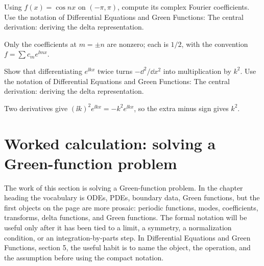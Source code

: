 \begin{exercise}
Using \(f(x)=\cos nx\) on \((-\pi,\pi)\), compute its complex Fourier coefficients.  Use the notation of Differential Equations and Green Functions: The central derivation: deriving the delta representation.
\begin{answer}
Only the coefficients at \(m=\pm n\) are nonzero; each is \(1/2\), with the convention \(f=\sum c_me^{\ii mx}\).
\end{answer}
\end{exercise}

\begin{exercise}
Show that differentiating \(e^{\ii kx}\) twice turns \(-\dd^2/\dd x^2\) into multiplication by \(k^2\).  Use the notation of Differential Equations and Green Functions: The central derivation: deriving the delta representation.
\begin{answer}
Two derivatives give \((\ii k)^2e^{\ii kx}=-k^2e^{\ii kx}\), so the extra minus sign gives \(k^2\).
\end{answer}
\end{exercise}



\section{Worked calculation: solving a Green-function problem}













The work of this section is solving a Green-function problem.  In the chapter heading the vocabulary is ODEs, PDEs, boundary data, Green functions, but the first objects on the page are more prosaic: periodic functions, modes, coefficients, transforms, delta functions, and Green functions.  The formal notation will be useful only after it has been tied to a limit, a symmetry, a normalization condition, or an integration-by-parts step.  In Differential Equations and Green Functions, section 5, the useful habit is to name the object, the operation, and the assumption before using the compact notation.

